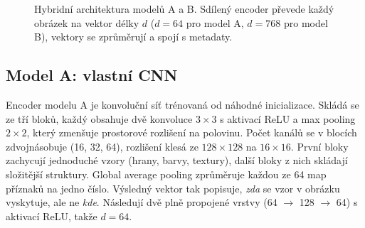 \begin{figure}[h]
    \centering
    \caption{Hybridní architektura modelů A a B. Sdílený encoder převede každý obrázek na vektor
    délky $d$ ($d = 64$ pro model A, $d = 768$ pro model B), vektory se zprůměrují a spojí s metadaty.}
    \label{fig:architektura}
\end{figure}

\subsection*{Model A: vlastní CNN}

Encoder modelu A je konvoluční síť trénovaná od náhodné inicializace. Skládá se ze tří bloků,
každý obsahuje dvě konvoluce $3 \times 3$ s aktivací ReLU a max pooling $2 \times 2$, který
zmenšuje prostorové rozlišení na polovinu. Počet kanálů se v blocích zdvojnásobuje
(16, 32, 64), rozlišení klesá ze $128 \times 128$ na $16 \times 16$. První bloky zachycují
jednoduché vzory (hrany, barvy, textury), další bloky z nich skládají složitější struktury.
Global average pooling zprůměruje každou ze 64 map příznaků na jedno číslo. Výsledný vektor
tak popisuje, \emph{zda} se vzor v obrázku vyskytuje, ale ne \emph{kde}. Následují dvě plně
propojené vrstvy (64 $\rightarrow$ 128 $\rightarrow$ 64) s aktivací ReLU, takže $d = 64$.


